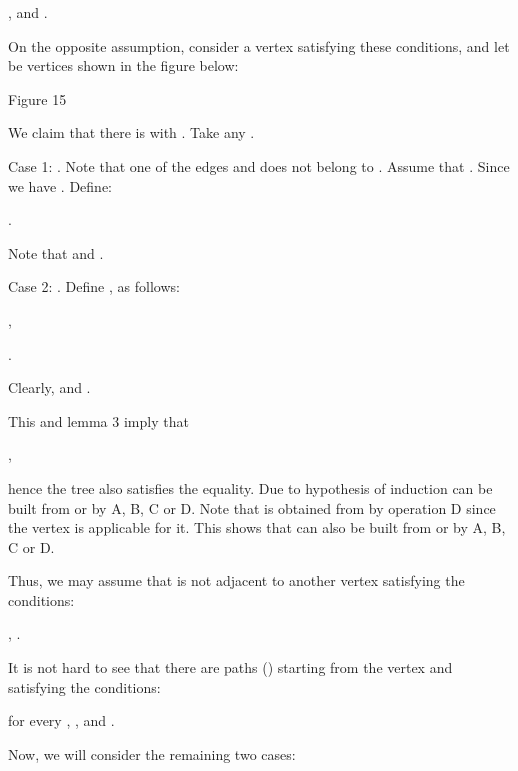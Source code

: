 \documentclass{article}
\begin{document}
\begin{center}
,   and .
\end{center}

On the opposite assumption, consider a vertex  satisfying these
conditions, and let  be vertices shown in the figure below:

\begin{center}

Figure 15\bigskip
\end{center}

We claim that there is  with . Take any .

Case 1: . Note that one of the edges  and  does not belong to . Assume
that . Since  we have . Define:

\begin{center}
.
\end{center}

Note that  and .

Case 2: . Define ,  as
follows:

\begin{center}
,

.
\end{center}

Clearly,  and .

This and lemma 3 imply that

\begin{center}
,
\end{center}

hence the tree  also satisfies the  equality. Due to hypothesis of induction  can be built from  or  by A, B, C or D.
Note that  is obtained from  by
operation D since the vertex  is applicable for it. This shows that 
can also be built from  or  by A, B, C or D.

Thus, we may assume that  is not adjacent to another vertex  satisfying the conditions:

\begin{center}
,  .
\end{center}

It is not hard to see that there are paths  () starting from the vertex  and satisfying the conditions:

\begin{center}
for every  , ,  and .
\end{center}

Now, we will consider the remaining two cases:
\end{document}
